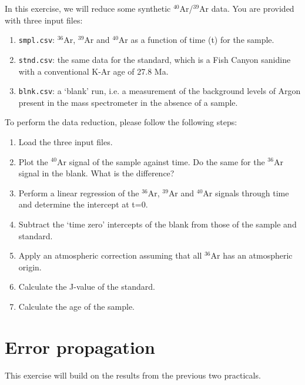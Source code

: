 \documentclass{book}
\begin{document}
In this exercise, we will reduce some synthetic $^{40}$Ar/$^{39}$Ar
data. You are provided with three input files:
\begin{enumerate}
\item{\tt smpl.csv}: $^{36}$Ar, $^{39}$Ar and $^{40}$Ar as a function
  of time (t) for the sample.
\item{\tt stnd.csv}: the same data for the standard, which is a Fish
  Canyon sanidine with a conventional K-Ar age of 27.8 Ma.
\item{\tt blnk.csv}: a `blank' run, i.e. a measurement of the
  background levels of Argon present in the mass spectrometer in the
  absence of a sample.
\end{enumerate}

To perform the data reduction, please follow the following steps:

\begin{enumerate}
\item Load the three input files.
\item Plot the $^{40}$Ar signal of the sample against time. Do the
  same for the $^{36}$Ar signal in the blank. What is the difference?
\item Perform a linear regression of the $^{36}$Ar, $^{39}$Ar and
  $^{40}$Ar signals through time and determine the intercept at t=0.
\item Subtract the `time zero' intercepts of the blank from those of
  the sample and standard.
\item Apply an atmospheric correction assuming that all $^{36}$Ar has
  an atmospheric origin.
\item Calculate the J-value of the standard.
\item Calculate the age of the sample.
\end{enumerate}

\section{Error propagation}
\label{sec:errorprop-R}

This exercise will build on the results from the previous two
practicals.
\end{document}
